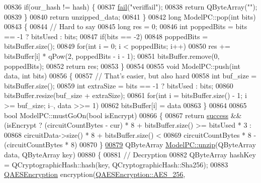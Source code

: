 \begin{DoxyCode}
{00836     \textcolor{keywordflow}{if}(our\_hash != hash) \{
00837         \hyperlink{class_model_p_c_a47464b59b7e37fcee25e55475708aabd}{fail}(\textcolor{stringliteral}{"veriffail"});
00838         \textcolor{keywordflow}{return} QByteArray(\textcolor{stringliteral}{""});
00839     \}
00840     \textcolor{keywordflow}{return} unzipped\_data;
00841 \}
00842 \textcolor{keywordtype}{long} ModelPC::pop(\textcolor{keywordtype}{int} bits)
00843 \{
00844     \textcolor{comment}{// Hard to say}
00845     \textcolor{keywordtype}{long} res = 0;
00846     \textcolor{keywordtype}{int} poppedBits = bits == -1 ? bitsUsed : bits;
00847     \textcolor{keywordflow}{if}(bits == -2)
00848         poppedBits = bitsBuffer.size();
00849     \textcolor{keywordflow}{for}(\textcolor{keywordtype}{int} i = 0; i < poppedBits; i++)
00850         res += bitsBuffer[i] * qPow(2, poppedBits - i - 1);
00851     bitsBuffer.remove(0, poppedBits);
00852     \textcolor{keywordflow}{return} res;
00853 \}
00854 
00855 \textcolor{keywordtype}{void} ModelPC::push(\textcolor{keywordtype}{int} data, \textcolor{keywordtype}{int} bits)
00856 \{
00857     \textcolor{comment}{// That's easier, but also hard}
00858     \textcolor{keywordtype}{int} buf\_size = bitsBuffer.size();
00859     \textcolor{keywordtype}{int} extraSize = bits == -1 ? bitsUsed : bits;
00860     bitsBuffer.resize(buf\_size + extraSize);
00861     \textcolor{keywordflow}{for}(\textcolor{keywordtype}{int} i = bitsBuffer.size() - 1; i >= buf\_size; i--, data >>= 1)
00862         bitsBuffer[i] = data %
00863 \}
00864 
00865 \textcolor{keywordtype}{bool} ModelPC::mustGoOn(\textcolor{keywordtype}{bool} isEncrypt)
00866 \{
00867     \textcolor{keywordflow}{return} \hyperlink{class_model_p_c_a945ffbbc44a832b953c191debd448f4c}{success} && (isEncrypt ? (circuitCountBytes - cur) * 8 + bitsBuffer.size() >= bitsUsed * 3
       :
00868                                    circuitData->size() * 8 + bitsBuffer.size() <
00869                                    circuitCountBytes * 8 - (circuitCountBytes * 8)%
00870 \}
\hypertarget{modelpc_8cpp_source.tex_l00879}{}\hyperlink{class_model_p_c_a6da88f166785a49f73b22c169f956fd0}{00879} QByteArray \hyperlink{class_model_p_c_a6da88f166785a49f73b22c169f956fd0}{ModelPC::unzip}(QByteArray data, QByteArray key)
00880 \{
00881     \textcolor{comment}{// Decryption}
00882     QByteArray hashKey = QCryptographicHash::hash(key, QCryptographicHash::Sha256);
00883     \hyperlink{class_q_a_e_s_encryption}{QAESEncryption} encryption(\hyperlink{class_q_a_e_s_encryption_abe48208f4f6c7d68e6a10b49b9d0b7bdacde97774ab1d4c609e04b0dd13a1e1f7}{QAESEncryption::AES\_256}, 
}
\end{DoxyCode}
